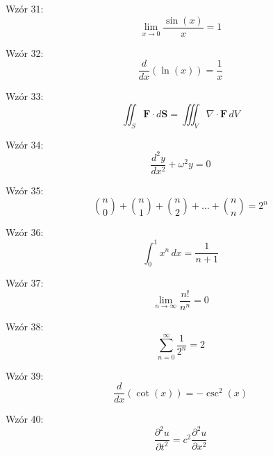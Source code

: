 \documentclass{article}
\begin{document}
Wzór 31:
\[ \lim_{{x \to 0}} \frac{\sin(x)}{x} = 1 \]

Wzór 32:
\[ \frac{d}{dx}\left(\ln(x)\right) = \frac{1}{x} \]

Wzór 33:
\[ \iint_S \mathbf{F} \cdot d\mathbf{S} = \iiint_V \nabla \cdot \mathbf{F} \,dV \]

Wzór 34:
\[ \frac{d^2y}{dx^2} + \omega^2y = 0 \]

Wzór 35:
\[ \binom{n}{0} + \binom{n}{1} + \binom{n}{2} + \ldots + \binom{n}{n} = 2^n \]

Wzór 36:
\[ \int_{0}^{1} x^n \,dx = \frac{1}{n+1} \]

Wzór 37:
\[ \lim_{{n \to \infty}} \frac{n!}{n^n} = 0 \]

Wzór 38:
\[ \sum_{n=0}^{\infty} \frac{1}{2^n} = 2 \]

Wzór 39:
\[ \frac{d}{dx}\left(\cot(x)\right) = -\csc^2(x) \]

Wzór 40:
\[ \frac{\partial^2u}{\partial t^2} = c^2 \frac{\partial^2u}{\partial x^2} \]
\end{document}
